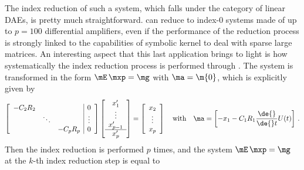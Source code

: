The index reduction of such a system, which falls under the category of linear \acp{DAE}, is pretty much straightforward. \Indigo{} can reduce to index-0 systems made of up to $p = 100$ differential amplifiers, even if the performance of the reduction process is strongly linked to the capabilities of \Maple{} symbolic kernel to deal with sparse large matrices. An interesting aspect that this last application brings to light is how systematically the index reduction process is performed through \Indigo{}. The system is transformed in the form $\mE \, \mxp = \mg$ with $\ma = \m{0}$, which is explicitly given by
%
\begin{equation*}
  \left[\begin{array}{ccc|c}
    -C_2 R_2 & & & 0 \\
    & \ddots & & \vdots \\
    & & -C_p R_p & 0 \\
  \end{array}\right]
  \left[\begin{array}{c}
    x_1^{\prime} \\ \vdots \\ x_{p-1}^{\prime} \\ \hline x_p^{\prime}
  \end{array}\right] = \left[\begin{array}{c}
    x_2 \\ \vdots \\ x_p
  \end{array}\right]
  \quad \text{with} \quad
  \ma = \begin{bmatrix}
    - x_1 - C_1 R_1 \dfrac{\de{}}{\de{}t}U(t)
  \end{bmatrix} \, \text{.}
\end{equation*}
%
Then the index reduction is performed $p$ times, and the system $\mE \, \mxp = \mg$ at the $k$-th index reduction step is equal to
%
